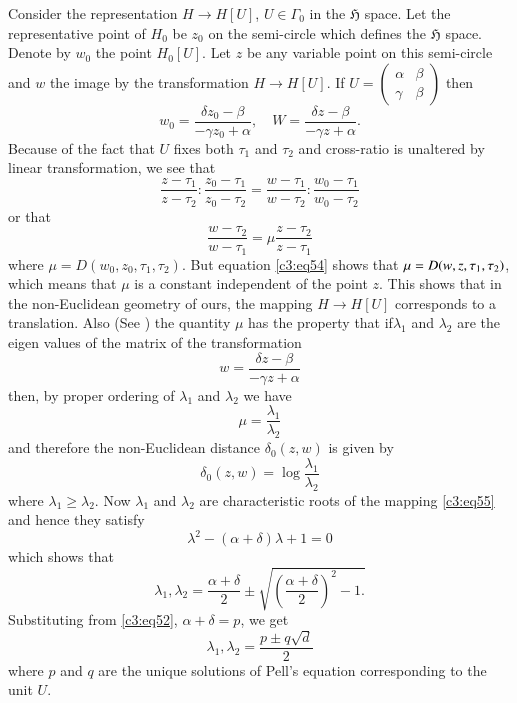 Consider the representation $H\to H[U]$, $U\in\Gamma_{0}$ in the
$\mathfrak{H}$ space. Let the representative point of $H_{0}$ be
$z_{0}$ on the semi-circle which defines the $\mathfrak{H}$
space. Denote by $w_{0}$ the point $H_{0}[U]$. Let $z$ be any variable
point on this semi-circle and $w$ the image by the transformation
$H\to H[U]$. If $U=\left(\begin{smallmatrix}\alpha & \beta\\ \gamma &
  \beta
\end{smallmatrix}\right)$ then
$$
w_{0}=\frac{\delta z_{0}-\beta}{-\gamma z_{0}+\alpha},\quad
W=\frac{\delta z-\beta}{-\gamma z+\alpha}.
$$
Because of the fact that $U$ fixes both $\tau_{1}$ and $\tau_{2}$ and
cross-ratio is unaltered by linear transformation, we see that
$$
\frac{z-\tau_{1}}{z-\tau_{2}}:\frac{z_{0}-\tau_{1}}{z_{0}-\tau_{2}}=\frac{w-\tau_{1}}{w-\tau_{2}}:\frac{w_{0}-\tau_{1}}{w_{0}-\tau_{2}} 
$$
or that
\begin{equation*}
\frac{w-\tau_{2}}{w-\tau_{1}}=\mu
\frac{z-\tau_{2}}{z-\tau_{1}}\tag{54}\label{c3:eq54} 
\end{equation*}
where $\mu=D(w_{0},z_{0},\tau_{1},\tau_{2})$. But equation \eqref{c3:eq54}
shows that $\mu=D(w,z,\break\tau_{1},\tau_{2})$, which means that $\mu$ is a
constant independent of the point $z$. This shows that in the
non-Euclidean geometry of ours, the mapping $H\to H[U]$ corresponds to
a translation. Also (See \cite{c3:key11}) the quantity $\mu$ has the
property that if\pageoriginale $\lambda_{1}$ and $\lambda_{2}$ are the
eigen values of the matrix of the transformation
\begin{equation*}
w=\frac{\delta z-\beta}{-\gamma z+\alpha}\tag{55}\label{c3:eq55}
\end{equation*}
then, by proper ordering of $\lambda_{1}$ and $\lambda_{2}$ we have
$$
\mu=\frac{\lambda_{1}}{\lambda_{2}}
$$
and therefore the non-Euclidean distance $\delta_{0}(z,w)$ is given by 
$$
\delta_{0}(z,w)=\log\frac{\lambda_{1}}{\lambda_{2}}
$$
where $\lambda_{1}\geq\lambda_{2}$. Now $\lambda_{1}$ and
$\lambda_{2}$ are characteristic roots of the mapping \eqref{c3:eq55} and
hence they satisfy
$$
\lambda^{2}-(\alpha+\delta)\lambda+1=0
$$
which shows that
$$
\lambda_{1},\lambda_{2}=\frac{\alpha + \delta}{2}\pm
\sqrt{\left(\dfrac{\alpha+\delta}{2}\right)^2 -1.}
$$
Substituting from \eqref{c3:eq52}, $\alpha+\delta=p$, we get
\begin{equation*}
\lambda_{1},\lambda_{2}=\frac{p\pm q\sqrt{d}}{2}\tag{56}\label{c3:eq56}
\end{equation*}
where $p$ and $q$ are the unique solutions of Pell's equation
corresponding to the unit $U$.

